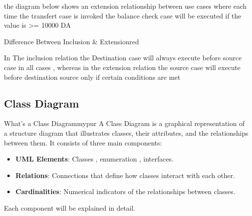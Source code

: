 \vspace{0.25cm}
the diagram below shows an extension relationship between use cases where each time the transfert case is invoked
the balance check case will be executed if the value is \textgreater= 10000 DA

\vspace{0.15cm}


        \begin{center}
    \end{center}

        \vspace{1cm}

\begin{prettyBox}{Difference Between Inclusion \& Extension}{red}

In The inclusion relation the Destination case will always execute before source case in all cases , whereas
in the extension relation the source case will execute before destination source only if certain conditions
are met

\end{prettyBox}

\vspace{1cm}
\subsection{Class Diagram}

\begin{prettyBox}{What's a Class Diagram}{mypur}
A Class Diagram is a graphical representation of a structure diagram that illustrates classes, their attributes, and the relationships between them. It consists of three main components:
\begin{itemize}
    \item \textbf{UML Elements}: Classes , enumeration , interfaces.
    \item \textbf{Relations}: Connections that define how classes interact with each other.
    \item \textbf{Cardinalities}: Numerical indicators of the relationships between classes.
\end{itemize}

Each component will be explained in detail.
\end{prettyBox}

